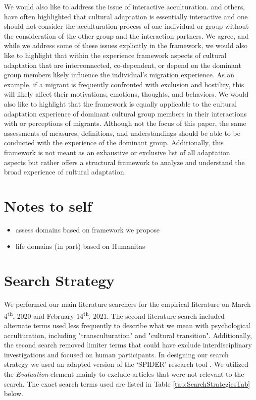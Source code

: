 \documentclass[man, 12pt, a4paper]{apa7}
\begin{document}
We would also like to address the issue of interactive acculturation. \citet{Bourhis1997a} and others, have often highlighted that cultural adaptation is essentially interactive and one should not consider the acculturation process of one individual or group without the consideration of the other group and the interaction partners. We agree, and while we address some of these issues explicitly in the framework, we would also like to highlight that within the experience framework aspects of cultural adaptation that are interconnected, co-dependent, or depend on the dominant group members likely influence the individual's migration experience. As an example, if a migrant is frequently confronted with exclusion and hostility, this will likely affect their motivations, emotions, thoughts, and behaviors. 
We would also like to highlight that the framework is equally applicable to the cultural adaptation experience of dominant cultural group members in their interactions with or perceptions of migrants. Although not the focus of this paper, the same assessments of measures, definitions, and understandings should be able to be conducted with the experience of the dominant group.
Additionally, this framework is not meant as an exhaustive or exclusive list of all adaptation aspects but rather offers a structural framework to analyze and understand the broad experience of cultural adaptation.

\section{Notes to self}
\begin{itemize}
  \item assess domains based on framework we propose
  \item life domains (in part) based on Humanitas
\end{itemize}

\printbibliography

\appendix

\section{Search Strategy}
\label{app:AppendixSearchStrategy}

We performed our main literature searchers for the empirical literature on March 4\textsuperscript{th}, 2020 and February 14\textsuperscript{th}, 2021. The second literature search included alternate terms used less frequently to describe what we mean with psychological acculturation, including "transculturation" and "cultural transition". Additionally, the second search removed limiter terms that could have exclude interdisciplinary investigations and focused on human participants.
In designing our search strategy we used an adapted version of the `SPIDER' research tool \citep[e.g.,][]{Cooke2012}. We utilized the \textit{Evaluation} element mainly to exclude articles that were not relevant to the search. The exact search terms used are listed in Table \ref{tab:SearchStrategiesTab} below.


\end{document}
